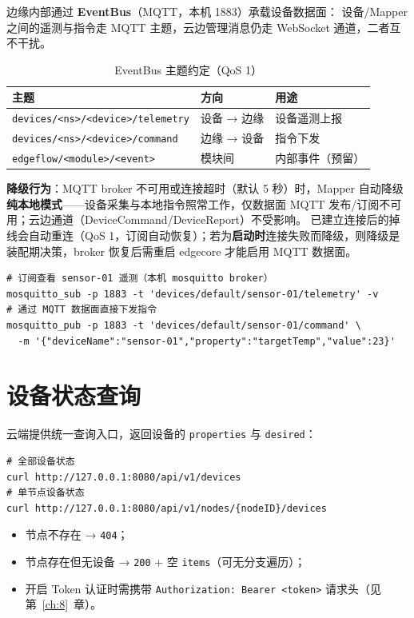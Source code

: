 边缘内部通过 \textbf{EventBus}（MQTT，本机 1883）承载设备数据面：
设备/Mapper 之间的遥测与指令走 MQTT 主题，云边管理消息仍走 WebSocket
通道，二者互不干扰。

\begin{table}[htbp]
\centering
\caption{EventBus 主题约定（QoS 1）}
\label{tab:6-topics}
\begin{tabularx}{\textwidth}{l l X}
\toprule
\textbf{主题} & \textbf{方向} & \textbf{用途} \\
\midrule
\texttt{devices/<ns>/<device>/telemetry} & 设备 → 边缘 & 设备遥测上报 \\
\texttt{devices/<ns>/<device>/command} & 边缘 → 设备 & 指令下发 \\
\texttt{edgeflow/<module>/<event>} & 模块间 & 内部事件（预留） \\
\bottomrule
\end{tabularx}
\end{table}

\textbf{降级行为}：MQTT broker 不可用或连接超时（默认 5 秒）时，Mapper
自动降级\textbf{纯本地模式}——设备采集与本地指令照常工作，仅数据面
MQTT 发布/订阅不可用；云边通道（DeviceCommand/DeviceReport）不受影响。
已建立连接后的掉线会自动重连（QoS 1，订阅自动恢复）；若为\textbf{启动时}连接失败而降级，则降级是装配期决策，broker 恢复后需重启 edgecore 才能启用 MQTT 数据面。

\begin{lstlisting}
# 订阅查看 sensor-01 遥测（本机 mosquitto broker）
mosquitto_sub -p 1883 -t 'devices/default/sensor-01/telemetry' -v
# 通过 MQTT 数据面直接下发指令
mosquitto_pub -p 1883 -t 'devices/default/sensor-01/command' \
  -m '{"deviceName":"sensor-01","property":"targetTemp","value":23}'
\end{lstlisting}

\section{设备状态查询}

云端提供统一查询入口，返回设备的 \texttt{properties} 与 \texttt{desired}：

\begin{lstlisting}
# 全部设备状态
curl http://127.0.0.1:8080/api/v1/devices
# 单节点设备状态
curl http://127.0.0.1:8080/api/v1/nodes/{nodeID}/devices
\end{lstlisting}

\begin{itemize}
  \item 节点不存在 → \texttt{404}；
  \item 节点存在但无设备 → \texttt{200} + 空 \texttt{items}（可无分支遍历）；
  \item 开启 Token 认证时需携带 \texttt{Authorization: Bearer <token>}
        请求头（见第~\ref{ch:8}~章）。
\end{itemize}

